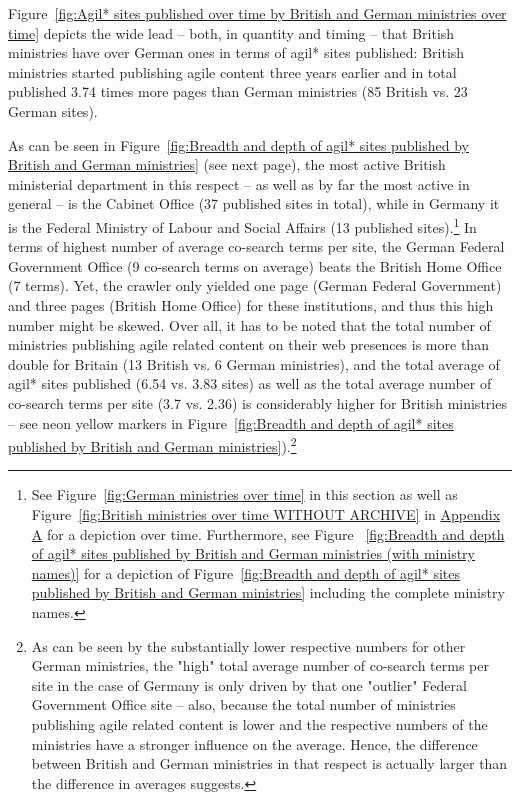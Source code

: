 Figure~\ref{fig:Agil* sites published over time by British and German ministries over time} depicts the wide lead – both, in quantity and timing – that British ministries have over German ones in terms of agil* sites published: British ministries started publishing agile content three years earlier and in total published 3.74 times more pages than German ministries (85 British vs. 23 German sites).

As can be seen in Figure~\ref{fig:Breadth and depth of agil* sites published by British and German ministries} (see next page), the most active British ministerial department in this respect – as well as by far the most active in general – is the Cabinet Office (37 published sites in total), while in Germany it is the Federal Ministry of Labour and Social Affairs (13 published sites).\footnote{See Figure~\ref{fig:German ministries over time} in this section as well as Figure~\ref{fig:British ministries over time WITHOUT ARCHIVE} in \hyperref[Appendix A]{Appendix A} for a depiction over time. Furthermore, see Figure
~\ref{fig:Breadth and depth of agil* sites published by British and German ministries (with ministry names)} for a depiction of Figure~\ref{fig:Breadth and depth of agil* sites published by British and German ministries} including the complete ministry names.} In terms of highest number of average co-search terms per site, the German Federal Government Office (9 co-search terms on average) beats the British Home Office (7 terms). Yet, the crawler only yielded one page (German Federal Government) and three pages (British Home Office) for these institutions, and thus this high number might be skewed. Over all, it has to be noted that the total number of ministries publishing agile related content on their web presences is more than double for Britain (13 British vs. 6 German ministries), and the total average of agil* sites published (6.54 vs. 3.83 sites) as well as the total average number of co-search terms per site (3.7 vs. 2.36) is considerably higher for British ministries – see neon yellow markers in Figure~\ref{fig:Breadth and depth of agil* sites published by British and German ministries}).\footnote{As can be seen by the substantially lower respective numbers for other German ministries, the "high" total average number of co-search terms per site in the case of Germany is only driven by that one "outlier" Federal Government Office site – also, because the total number of ministries publishing agile related content is lower and the respective numbers of the ministries have a stronger influence on the average. Hence, the difference between British and German ministries in that respect is actually larger than the difference in averages suggests.}

